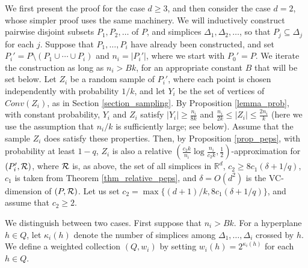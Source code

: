 \documentclass[11pt]{article}
\def\reals{\mathbb R}
\def\R{\cal{R}}
\begin{document}
 We first present the proof for the case $d \geq 3$, and then consider the case $d = 2$, whose simpler proof uses the same machinery. We will inductively construct pairwise disjoint subsets $P_{1}, P_{2}, \ldots $ of $P$, and simplices $\Delta_{1}, \Delta_{2}, \ldots$, so that $P_{j} \subseteq \Delta_{j}$ for each $j$. Suppose that $P_{1}, \ldots, P_{i}$ have already been constructed, and set $P_{i}' = P\setminus(P_{1} \cup \cdots \cup P_{i})$ and $n_{i} = |P_{i}'|$, where we start with $P_{0}' = P$. We iterate the construction as long as $n_{i} > Bk$, for an appropriate constant $B$ that will be set below. Let $Z_{i}$ be a random sample of $P_{i}'$, where each point is chosen independently with probability $1/k$, and let $Y_{i}$ be the set of vertices of $Conv(Z_{i})$, as in Section \ref{section_sampling}. By Proposition \ref{lemma_prob}, with constant probability, $Y_{i}$ and $Z_{i}$ satisfy $|Y_{i}| \geq \frac{n_{i}}{8k}$ and $\frac{n_{i}}{2k} \leq |Z_{i}| \leq \frac{2n_{i}}{k}$ (here we use the assumption that $n_{i}/k$ is sufficiently large; see below). Assume that the sample $Z_{i}$ does satisfy these properties. Then, by Proposition \ref{prop_peps}, with probability at least $1 - q$, $Z_{i}$ is also a relative $(\frac{c_{2}k}{n_{i}} \log \frac{n_{i}}{c_{2}k}, \frac{1}{2})$-approximation for $(P_{i}',\R)$, where $\R$ is, as above, the set of all simplices in $\reals^{d}$, $c_{2} \geq 8 c_{1} (\delta + 1/q)$, $c_{1}$ is taken from Theorem \ref{thm_relative_peps}, and $\delta = O(d^{2})$ is the VC-dimension of $(P,\R)$. Let us set $c_{2} = \max \{(d + 1)/k, 8 c_{1} (\delta + 1/q)\}$, and assume that $c_{2} \geq 2$.

We distinguish between two cases. First suppose that $n_{i} > Bk$. For a hyperplane $h \in Q$, let $\kappa_{i}(h)$ denote the number of simplices among $\Delta_{1}, \ldots, \Delta_{i}$ crossed by $h$. We define a weighted collection $(Q, w_{i})$ by setting $w_{i}(h) = 2^{\kappa_{i}(h)}$ for each $h \in Q$.
\end{document}

